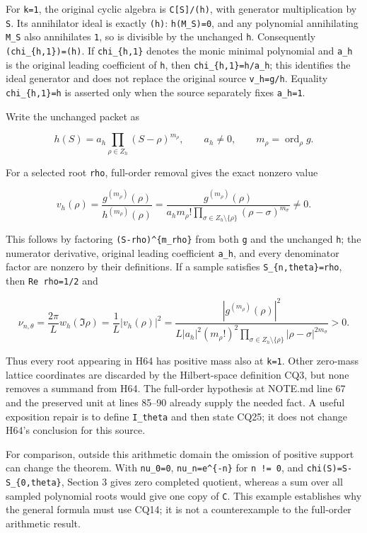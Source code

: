 For \texttt{k=1}, the original cyclic algebra is \texttt{C{[}S{]}/(h)}, with generator multiplication by \texttt{S}. Its annihilator ideal is exactly \texttt{(h)}: \texttt{h(M\_S)=0}, and any polynomial annihilating \texttt{M\_S} also annihilates \texttt{1}, so is divisible by the unchanged \texttt{h}. Consequently \texttt{(chi\_\{h,1\})=(h)}. If \texttt{chi\_\{h,1\}} denotes the monic minimal polynomial and \texttt{a\_h} is the original leading coefficient of \texttt{h}, then \texttt{chi\_\{h,1\}=h/a\_h}; this identifies the ideal generator and does not replace the original source \texttt{v\_h=g/h}. Equality \texttt{chi\_\{h,1\}=h} is asserted only when the source separately fixes \texttt{a\_h=1}.

Write the unchanged packet as

\[
h(S)=a_h\prod_{\rho\in Z_h}(S-\rho)^{m_\rho},
\qquad a_h\ne0,\qquad m_\rho=\operatorname{ord}_\rho g.
\tag{CQ23}
\]

For a selected root \texttt{rho}, full-order removal gives the exact nonzero value

\[
v_h(\rho)=
\frac{g^{(m_\rho)}(\rho)}{h^{(m_\rho)}(\rho)}=
\frac{g^{(m_\rho)}(\rho)}
{a_hm_\rho!\prod_{\sigma\in Z_h\setminus\{\rho\}}
(\rho-\sigma)^{m_\sigma}}\ne0.
\tag{CQ24}
\]

This follows by factoring \texttt{(S-rho)\^{}\{m\_rho\}} from both \texttt{g} and the unchanged \texttt{h}; the numerator derivative, original leading coefficient \texttt{a\_h}, and every denominator factor are nonzero by their definitions. If a sample satisfies \texttt{S\_\{n,theta\}=rho}, then \texttt{Re\ rho=1/2} and

\[
\nu_{n,\theta}
=\frac{2\pi}L w_h(\Im\rho)
=\frac1L|v_h(\rho)|^2
=\frac{|g^{(m_\rho)}(\rho)|^2}
{L|a_h|^2(m_\rho!)^2\prod_{\sigma\in Z_h\setminus\{\rho\}}|\rho-\sigma|^{2m_\sigma}}>0.
\tag{CQ25}
\]

Thus every root appearing in H64 has positive mass also at \texttt{k=1}. Other zero-mass lattice coordinates are discarded by the Hilbert-space definition CQ3, but none removes a summand from H64. The full-order hypothesis at NOTE.md line 67 and the preserved unit at lines 85--90 already supply the needed fact. A useful exposition repair is to define \texttt{I\_theta} and then state CQ25; it does not change H64's conclusion for this source.

For comparison, outside this arithmetic domain the omission of positive support can change the theorem. With \texttt{nu\_0=0}, \texttt{nu\_n=e\^{}\{-\textbar{}n\textbar{}\}} for \texttt{n\ !=\ 0}, and \texttt{chi(S)=S-S\_\{0,theta\}}, Section 3 gives zero completed quotient, whereas a sum over all sampled polynomial roots would give one copy of \texttt{C}. This example establishes why the general formula must use CQ14; it is not a counterexample to the full-order arithmetic result.

